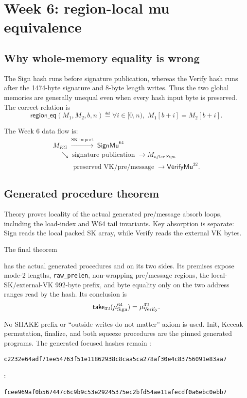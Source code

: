 \section{Week 6: region-local mu equivalence}

\subsection{Why whole-memory equality is wrong}

The Sign hash runs before signature publication, whereas the Verify hash runs
after the 1474-byte signature and 8-byte length writes. Thus the two global
memories are generally unequal even when every hash input byte is preserved.
The correct relation is
\[
  \mathsf{region\_eq}(M_1,M_2,b,n)
  \eqdef
  \forall i\in[0,n),\;M_1[b+i]=M_2[b+i].
\]

The Week 6 data flow is:
\[
\begin{array}{c}
 M_{KG}\;\xrightarrow{\text{SK import}}\;\mathsf{SignMu}^{64}\\
 \quad\searrow\;\text{signature publication}\;\to M_{after\,Sign}\\
 \qquad\quad\text{preserved VK/pre/message}\;\to\mathsf{VerifyMu}^{32}.
\end{array}
\]

\subsection{Generated procedure theorem}

Theory  proves locality of the actual
generated pre/message absorb loops, including the load-index and W64 tail
invariants. Key absorption is separate: Sign reads the local packed SK array,
while Verify reads the external VK bytes.

The final theorem
\begin{quote}
\small
{}
\end{quote}
has the actual generated procedures
 and  on its two sides. Its
premises expose mode-2 lengths, \texttt{raw\_prelen}, non-wrapping pre/message
regions, the local-SK/external-VK 992-byte prefix, and byte equality only on
the two address ranges read by the hash. Its conclusion is
\[
  \mathsf{take}_{32}(\mu_{\mathrm{Sign}}^{64})
  = \mu_{\mathrm{Verify}}^{32}.
\]

No SHAKE prefix or ``outside writes do not matter'' axiom is used. Init,
Keccak permutation, finalize, and both squeeze procedures are the pinned
generated programs. The generated focused hashes remain
\noindent{}:
\begin{verbatim}
c2232e64adf71ee54763f51e11862938c8caa5ca278af30e4c83756091e83aa7
\end{verbatim}
\noindent{}:
\begin{verbatim}
fcee969af0b567447c6c9b9c53e29245375ec2bfd54ae11afecdf0a6ebc0ebb7
\end{verbatim}

